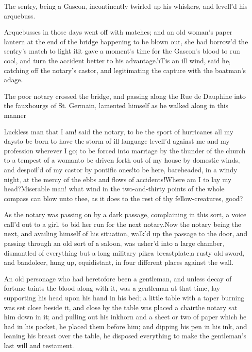 \documentclass[twoside]{article}
\begin{document}
The sentry, being a Gascon, incontinently
twirled up his whiskers, and levell’d his
arquebuss.

Arquebusses in those days went off with
matches; and an old woman’s paper lantern
at the end of the bridge happening to be
blown out, she had borrow’d the sentry’s
match to light it\tskk it gave a moment’s
time for the Gascon’s blood to run cool,
and turn the accident better to his
advantage.\tskk ’\i{Tis an ill wind}, said
he, catching off the notary’s castor, and
legitimating the capture with the
boatman’s adage.

The poor notary crossed the bridge, and
passing along the Rue de Dauphine into the
fauxbourgs of St. Germain, lamented
himself as he walked along in this
manner\tskk 

Luckless man that I am! said the notary,
to be the sport of hurricanes all my
days\tskk to be born to have the storm of
ill language levell’d against me and my
profession wherever I go; to be forced
into marriage by the thunder of the church
to a tempest of a woman\tskk to be driven
forth out of my house by domestic winds,
and despoil’d of my castor by pontific
ones!\tskk to be here, bareheaded, in a
windy night, at the mercy of the ebbs and
flows of accidents!\tskk Where am I to lay
my head?\tskk Miserable man! what wind in
the two-and-thirty points of the whole
compass can blow unto thee, as it does to
the rest of thy fellow-creatures, good?

As the notary was passing on by a dark
passage, complaining in this sort, a voice
call’d out to a girl, to bid her run for
the next notary.\tskk Now the notary being
the next, and availing himself of his
situation, walk’d up the passage to the
door, and passing through an old sort of a
saloon, was usher’d into a large chamber,
dismantled of everything but a long
military pike\tskk a breastplate,\tskk a
rusty old sword, and bandoleer, hung up,
equidistant, in four different places
against the wall.

An old personage who had heretofore been a
gentleman, and unless decay of fortune
taints the blood along with it, was a
gentleman at that time, lay supporting his
head upon his hand in his bed; a little
table with a taper burning was set close
beside it, and close by the table was
placed a chair\tskk the notary sat him
down in it; and pulling out his inkhorn
and a sheet or two of paper which he had
in his pocket, he placed them before him;
and dipping his pen in his ink, and
leaning his breast over the table, he
disposed everything to make the
gentleman’s last will and testament.
\end{document}
